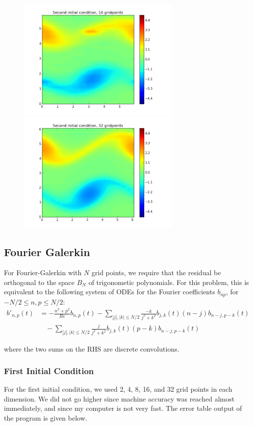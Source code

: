 \documentclass[12pt]{article}
\begin{document}
\begin{figure}[H]
\includegraphics[width=8cm]{images/collocs16.png}
\includegraphics[width=8cm]{images/collocs32.png}
\end{figure}


\subsection*{Fourier Galerkin}
For Fourier-Galerkin with $N$ grid points, we require that the residual be orthogonal to the space $B_N$ of trigonometic polynomials. For this problem, this is equivalent to the following system of ODEs for the Fourier coefficients $b_{np}$, for $-N/2 \leq n, p \leq N/2$:
\begin{align*}
b'_{n,p}(t) &= -\frac{n^2 + p^2}{Re}b_{n,p}(t) - \sum_{|j|,|k|\leq N/2}\frac{-k}{j^2 + k^2}b_{j,k}(t)(n-j)b_{n-j,p-k}(t) \\
&\:\:\:\:- \sum_{|j|,|k|\leq N/2}\frac{j}{j^2 + k^2}b_{j,k}(t)(p-k)b_{n-j,p-k}(t)
\end{align*}

where the two sums on the RHS are discrete convolutions.

\subsubsection*{First Initial Condition}
For the first initial condition, we used 2, 4, 8, 16, and 32 grid points in each dimension. We did not go higher since machine accuracy was reached almost immediately, and since my computer is not very fast. The error table output of the program is given below.
\end{document}
